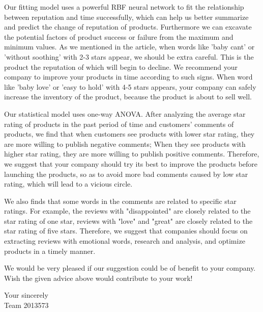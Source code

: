 \documentclass{mcmthesis}
\begin{document}
\begin{memo}
Our fitting model uses a powerful RBF neural network to fit the relationship between reputation and time successfully, which can help us better summarize and predict the change of reputation of products. Furthermore we can excavate the potential factors of product success or failure from the maximum and minimum values. As we mentioned in the article, when words like 'baby cant' or 'without soothing' with 2-3 stars appear, we should be extra careful. This is the product the reputation of which  will begin to decline. We recommend your company to improve your products in time according to such signs. When word like 'baby love' or 'easy to hold' with 4-5 stars appears, your company can safely increase the inventory of the product, because the product is about to sell well.

Our statistical model uses one-way ANOVA. After analyzing the average star rating of products in the past period of time and customers' comments of products, we find that when customers see products with lower star rating, they are more willing to publish negative comments; When they see products with higher star rating, they are more willing to publish positive comments. Therefore, we suggest that your company should try its best to improve the products before launching the products, so as to avoid more bad comments caused by low star rating, which will lead to a vicious circle.

We also finds that some words in the comments are related to specific star ratings. For example, the reviews with "disappointed" are closely related to the star rating of one star, reviews with "love" and "great" are closely related to the star rating of five stars. Therefore, we suggest that companies should focus on extracting reviews with emotional words, research and analysis, and optimize products in a timely manner.

We would be very pleased if our suggestion could be of benefit to your company. Wish the given advice above would contribute to your work! 

\begin{flushright}
	Your sincerely\\
	 Team 2013573
\end{flushright}

\thispagestyle{empty}

\end{memo}
\end{document}

